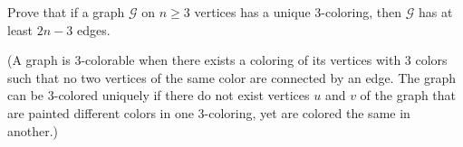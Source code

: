 Prove that if a graph $\mathcal{G}$ on $n\ge 3$ vertices has a unique $3$-coloring, then $\mathcal{G}$ has at least $2n-3$ edges.

(A graph is $3$-colorable when there exists a coloring of its vertices with $3$ colors such that no two vertices of the same color are connected by an edge. The graph can be $3$-colored uniquely if there do not exist vertices $u$ and $v$ of the graph that are painted different colors in one $3$-coloring, yet are colored the same in another.)
